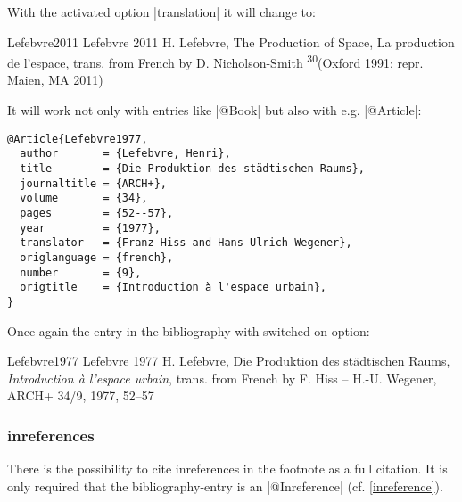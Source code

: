 \documentclass[a4paper,
10pt,
greek,
french,
spanish,
italian,
ngerman,
english
]{ltxdoc}
\begin{document}
With the activated option |translation| it will change to:
\begin{bibbsp}{Lefebvre2011}%
 Lefebvre 2011\hspace{2em} 
H. Lefebvre,  The Production of Space, {\color{red} La production de l’espace, trans. from French by D. Nicholson-Smith} \textsuperscript{30}(Oxford 1991; repr. Maien, MA 2011)
\end{bibbsp}
 
It will work not only with entries like |@Book| but also with e.g. |@Article|:
\begin{lstlisting}[style=bibentry,label=Lefebvre1977,caption={{@}Article\{Lefebvre1977,…\} }]
@Article{Lefebvre1977,
  author       = {Lefebvre, Henri},
  title        = {Die Produktion des städtischen Raums},
  journaltitle = {ARCH+},
  volume       = {34},
  pages        = {52--57},
  year         = {1977},
  translator   = {Franz Hiss and Hans-Ulrich Wegener},
  origlanguage = {french},
  number       = {9},
  origtitle    = {Introduction à l'espace urbain},
}
\end{lstlisting}

Once again the entry in the bibliography with switched on option:

\begin{bibbsp}{Lefebvre1977}%
 Lefebvre 1977\hspace{2em} H. Lefebvre, Die Produktion des städtischen Raums, \emph{Introduction à l’espace urbain}, {\color{red} trans. from French by F. Hiss – H.-U. Wegener}, ARCH+ 34/9, 1977, 52–57
\end{bibbsp}


\subsubsection{inreferences}\label{inreferences}
There is the possibility to cite inreferences in the footnote as a full citation.
It is only required that the bibliography-entry is an |@Inreference|  (cf. \cref{inreference}).
 
\end{document}
